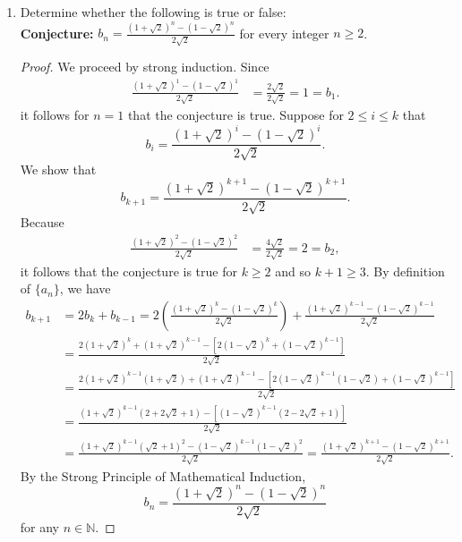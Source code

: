 \documentclass[12pt]{article}
\newcommand{\N}{\mathbb{N}}
\newenvironment{problem}[2][Problem]{\begin{trivlist}
		\item[\hskip \labelsep {\bfseries #1}\hskip \labelsep {\bfseries #2.}]}{\end{trivlist}}
\begin{document}
\begin{problem}{6}
\begin{enumerate}[label=(\alph*)]
			\item Determine whether the following is true or false:\\
			\textbf{Conjecture:} $b_{n} = \frac{(1+\sqrt{2})^{n} - (1-\sqrt{2})^{n}}{2\sqrt{2}}$ for every integer $n\geq 2$.\\
			\begin{proof}
				We proceed by strong induction. Since 
				\begin{align*}
				 \frac{(1+\sqrt{2})^{1} - (1-\sqrt{2})^{1}}{2\sqrt{2}} &= \frac{2\sqrt{2}}{2\sqrt{2}} = 1 = b_{1}.
				\end{align*}
			it follows for $n=1$ that the conjecture is true. Suppose for $2\leq i \leq k$ that 
			\begin{equation*}
				b_{i} = \frac{(1+\sqrt{2})^{i} - (1-\sqrt{2})^{i}}{2\sqrt{2}}.
			\end{equation*}
			We show that 
			\begin{equation*}
				b_{k+1} = \frac{(1+\sqrt{2})^{k+1} - (1-\sqrt{2})^{k+1}}{2\sqrt{2}}.
			\end{equation*}
		Because 
		\begin{align*}
			\frac{(1+\sqrt{2})^{2} - (1-\sqrt{2})^{2}}{2\sqrt{2}} &= \frac{4\sqrt{2}}{2\sqrt{2}} = 2 = b_{2},
		\end{align*}
	it follows that the conjecture is true for $k\geq 2$ and so $k+1\geq 3$. By definition of $\{a_{n}\}$, we have
	\begin{align*}
		b_{k+1} &= 2b_{k} + b_{k-1} = 2\left(\frac{(1+\sqrt{2})^{k} - (1-\sqrt{2})^{k}}{2\sqrt{2}}\right) + \frac{(1+\sqrt{2})^{k-1} - (1-\sqrt{2})^{k-1}}{2\sqrt{2}}\\
		&= \frac{2\left(1+\sqrt{2}\right)^{k} + \left(1+\sqrt{2}\right)^{k-1} - \left[ 2\left(1-\sqrt{2}\right)^{k} +  \left(1-\sqrt{2}\right)^{k-1}\right]}{2\sqrt{2}}\\
		&= \frac{2\left(1+\sqrt{2}\right)^{k-1}\left(1+\sqrt{2}\right) + \left(1+\sqrt{2}\right)^{k-1} - \left[ 2\left(1-\sqrt{2}\right)^{k-1}\left(1-\sqrt{2}\right) + \left(1-\sqrt{2}\right)^{k-1}\right]}{2\sqrt{2}}\\
		&= \frac{
			\left(1+\sqrt{2}\right)^{k-1}\left(2+2\sqrt{2}+1\right) - \left[ \left(1-\sqrt{2}\right)^{k-1}\left(2-2\sqrt{2}+1\right)\right]}{2\sqrt{2}}\\
		&= \frac{
			\left(1+\sqrt{2}\right)^{k-1}\left(\sqrt{2}+1\right)^{2} -  \left(1-\sqrt{2}\right)^{k-1}\left(1-\sqrt{2}\right)^{2}}{2\sqrt{2}} = \frac{
			\left(1+\sqrt{2}\right)^{k+1} -   \left(1-\sqrt{2}\right)^{k+1}}{2\sqrt{2}}.
	\end{align*}
	By the Strong Principle of Mathematical Induction, 
	\begin{equation*}
		b_{n} = \frac{\left(1+\sqrt{2}\right)^{n} - \left(1-\sqrt{2}\right)^{n}}{2\sqrt{2}}
	\end{equation*}
	for any $n\in \N$.
			\end{proof}
		\end{enumerate}
	\end{problem}
\end{document}
